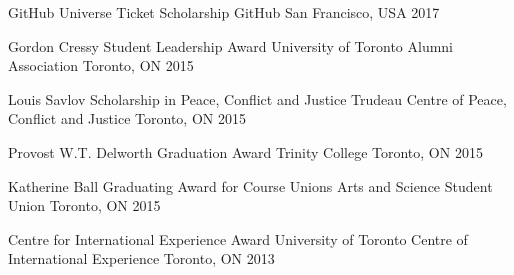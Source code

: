 \begin{cvhonors}

  \cvhonor
    {GitHub Universe Ticket Scholarship} %
    {GitHub} %
    {San Francisco, USA} %
    {2017} %

  \cvhonor
    {Gordon Cressy Student Leadership Award} %
    {University of Toronto Alumni Association} %
    {Toronto, ON} %
    {2015} %

  \cvhonor
    {Louis Savlov Scholarship in Peace, Conflict and Justice} %
    {Trudeau Centre of Peace, Conflict and Justice} %
    {Toronto, ON} %
    {2015} %

  \cvhonor
    {Provost W.T. Delworth Graduation Award} %
    {Trinity College} %
    {Toronto, ON} %
    {2015} %

  \cvhonor
    {Katherine Ball Graduating Award for Course Unions} %
    {Arts and Science Student Union} %
    {Toronto, ON} %
    {2015} %

  \cvhonor
    {Centre for International Experience Award} %
    {University of Toronto Centre of International Experience } %
    {Toronto, ON} %
    {2013} %

\end{cvhonors}
